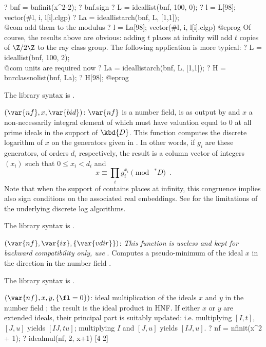 \bprog
? bnf = bnfinit(x^2-2);
? bnf.sign
? L = ideallist(bnf, 100, 0);
? l = L[98]; vector(#l, i, l[i].clgp)
? La = ideallistarch(bnf, L, [1,1]); \\@com add them to the modulus
? l = La[98]; vector(#l, i, l[i].clgp)
@eprog
Of course, the results above are obvious: adding $t$ places at infinity will
add $t$ copies of $\Z/2\Z$ to the ray class group. The following application
is more typical:
\bprog
? L = ideallist(bnf, 100, 2);        \\@com units are required now
? La = ideallistarch(bnf, L, [1,1]);
? H = bnrclassnolist(bnf, La);
? H[98];
@eprog

The library syntax is .

$(\var{nf},x,\var{bid})$: \label{se:ideallog}$\var{nf}$ is a number field,
 is as output by  and $x$ a
non-necessarily integral element of  which must have valuation
equal to 0 at all prime ideals in the support of $\kbd{D}$. This function
computes the discrete logarithm of $x$ on the generators given in
. In other words, if $g_i$ are these generators, of orders
$d_i$ respectively, the result is a column vector of integers $(x_i)$ such
that $0\le x_i<d_i$ and
$$x \equiv \prod_i g_i^{x_i} \pmod{\ ^*D}\enspace.$$
Note that when the support of  contains places at infinity, this
congruence implies also sign conditions on the associated real embeddings.
See  for the limitations of the underlying discrete log algorithms.

The library syntax is .

$(\var{nf},\var{ix},\{\var{vdir}\})$: \label{se:idealmin}\emph{This function is useless and kept for backward compatibility only,
use }. Computes a pseudo-minimum of the ideal $x$ in the
direction  in the number field .

The library syntax is .

$(\var{nf},x,y,\{\fl=0\})$: \label{se:idealmul}ideal multiplication of the ideals $x$ and $y$ in the number field
; the result is the ideal product in HNF. If either $x$ or $y$
are extended ideals, their principal part is suitably
updated: i.e. multiplying $[I,t]$, $[J,u]$ yields $[IJ, tu]$; multiplying
$I$ and $[J, u]$ yields $[IJ, u]$.
\bprog
? nf = nfinit(x^2 + 1);
? idealmul(nf, 2, x+1)
[4 2]

